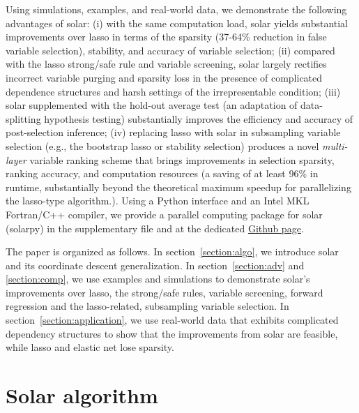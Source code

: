 \documentclass[11pt,review,authoryear]{elsarticle}
\begin{document}
Using simulations, examples, and real-world data, we demonstrate the following advantages of solar: (i) with the same computation load, solar yields substantial improvements over lasso in terms of the sparsity (37-64\% reduction in false variable selection), stability, and accuracy of variable selection; (ii) compared with the lasso strong/safe rule and variable screening, solar largely rectifies incorrect variable purging and sparsity loss in the presence of complicated dependence structures and harsh settings of the irrepresentable condition; (iii) solar supplemented with the hold-out average test (an adaptation of data-splitting hypothesis testing) substantially improves the efficiency and accuracy of post-selection inference; (iv) replacing lasso with solar in subsampling variable selection (e.g., the bootstrap lasso or stability selection) produces a novel \emph{multi-layer} variable ranking scheme that brings improvements in selection sparsity, ranking accuracy, and computation resources (a saving of at least 96\% in runtime, substantially beyond the theoretical maximum speedup for parallelizing the lasso-type algorithm.). Using a Python interface and an Intel MKL Fortran/C++ compiler, we provide a parallel computing package for solar (solarpy) in the supplementary file and at the dedicated \href{https://github.com/isaac2math/solarpy}{Github page}.

The paper is organized as follows. In section~\ref{section:algo}, we introduce solar and its coordinate descent generalization. In section~\ref{section:adv} and \ref{section:comp}, we  use examples and simulations to demonstrate solar's improvements over lasso, the strong/safe rules, variable screening, forward regression and the lasso-related, subsampling variable selection. In section~\ref{section:application}, we use real-world data that exhibits complicated dependency structures to show that the improvements from solar are feasible, while lasso and elastic net lose sparsity.


\section{Solar algorithm \label{section:algo}}
\end{document}
